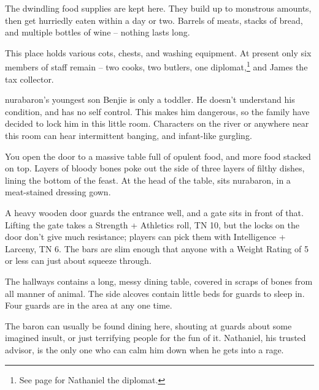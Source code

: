 \begin{multicols}{2}

The dwindling food supplies are kept here.  They build up to monstrous amounts, then get hurriedly eaten within a day or two.  Barrels of meats, stacks of bread, and multiple bottles of wine -- nothing lasts long.


This place holds various cots, chests, and washing equipment.  At present only six members of staff remain -- two cooks, two butlers, one diplomat,\footnote{See page \pageref{nathaniel} for Nathaniel the diplomat.} and James the tax collector.


\Gls{nurabaron}'s youngest son Benjie is only a toddler.
He doesn't understand his condition, and has no self control.
This makes him dangerous, so the family have decided to lock him in this little room.
Characters on the river or anywhere near this room can hear intermittent banging, and infant-like gurgling.



\begin{boxtext}

	You open the door to a massive table full of opulent food, and more food stacked on top.  Layers of bloody bones poke out the side of three layers of filthy dishes, lining the bottom of the feast.  At the head of the table, sits \gls{nurabaron}, in a meat-stained dressing gown.

\end{boxtext}

A heavy wooden door guards the entrance well, and a gate sits in front of that.  Lifting the gate takes a Strength + Athletics roll, TN 10, but the locks on the door don't give much resistance; players can pick them with Intelligence + Larceny, TN 6.  The bars are slim enough that anyone with a Weight Rating of 5 or less can just about squeeze through.

The hallways contains a long, messy dining table, covered in scraps of bones from all manner of animal.  The side alcoves contain little beds for guards to sleep in.  Four guards are in the area at any one time.

The baron can usually be found dining here, shouting at guards about some imagined insult, or just terrifying people for the fun of it.  Nathaniel, his trusted advisor, is the only one who can calm him down when he gets into a rage.


\end{multicols}
